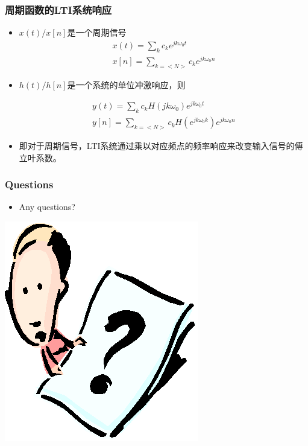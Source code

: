 \documentclass[CJKutf8,xcolor=pdftex,dvipsnames,table]{beamer}
\begin{document}
\begin{CJK*}{UTF8}{song}
  \begin{frame}
    \frametitle{周期函数的LTI系统响应}
    \begin{itemize}
    \item $x(t)/x[n]$是一个周期信号
    \begin{align*}
    x(t) = \sum_k c_k e^{jk\omega_0 t} \\
    x[n] = \sum_{k=<N>} c_k e^{jk\omega_0 n}
    \end{align*}
	\item $h(t)/h[n]$是一个系统的单位冲激响应，则
	
	\begin{align*}
	 y(t) = \sum_k c_k H(jk\omega_0) e^{jk\omega_0 t} \\
	 y[n] = \sum_{k=<N>} c_k H(e^{jk\omega_0 k}) e^{jk\omega_0 n}
	\end{align*}
    \item 即对于周期信号，LTI系统通过乘以对应频点的频率响应来改变输入信号的傅立叶系数。
    \end{itemize}
    
  \end{frame}            
     
  \begin{frame}
    \frametitle{Questions}
    \begin{itemize}
    \item Any questions?
    \end{itemize}
    \begin{center}
      \includegraphics[scale=.5]{question}
    \end{center}
  \end{frame} 



\end{CJK*}
\end{document}
